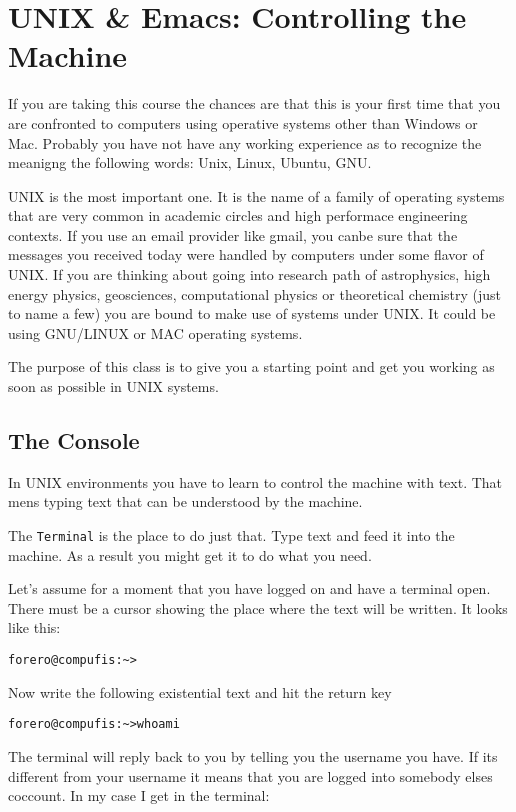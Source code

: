 \documentclass{article}
\begin{document}
\section{UNIX \& Emacs: Controlling the Machine}

If you are taking this course the chances are that this is your first time that you are confronted to computers using operative systems other than Windows or Mac. Probably you have not have any working experience as to recognize the meanigng the following words: Unix, Linux, Ubuntu, GNU.

UNIX is the most important one. It is the name of a family of operating systems that are very common in academic circles and high performace engineering contexts. If you use an email provider like gmail, you canbe sure that the messages you received today were handled by computers under some flavor of UNIX. If you are thinking about going into research path of astrophysics, high energy physics, geosciences, computational physics or theoretical chemistry (just to name a few) you are bound to make use of systems under UNIX. It could be using GNU/LINUX or MAC operating systems.


The purpose of this class is to give you a starting point and get you working as soon as possible in UNIX systems.

\subsection{The Console}
In UNIX environments you have to learn to control the machine with text. That mens typing text that can be understood by the machine.

The {\tt Terminal} is the place to do just that. Type text and feed it into the machine. As a result you might get it to do what you need. 

Let's assume for a moment that you have logged on and have a terminal open. There must be a cursor showing the place where the text will be written. It looks like this:

\begin{verbatim}
forero@compufis:~>
\end{verbatim}

Now write the following existential text and hit the return key

\begin{verbatim}
forero@compufis:~>whoami
\end{verbatim}

The terminal will reply back to you by telling you the username you have. If its different from your username it means that you are logged into somebody elses coccount. In my case I get in the terminal:
\end{document}
